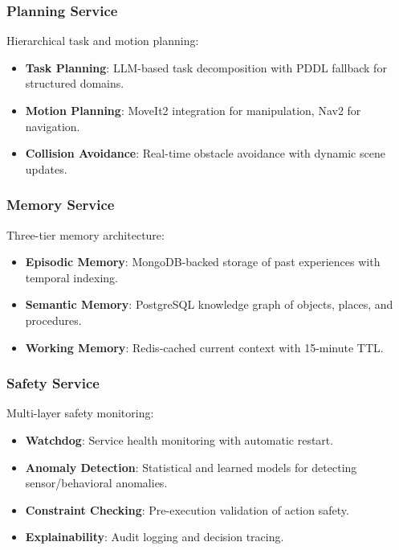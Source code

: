 \documentclass[conference]{IEEEtran}
\begin{document}
\subsubsection{Planning Service}

Hierarchical task and motion planning:

\begin{itemize}
    \item \textbf{Task Planning}: LLM-based task decomposition with PDDL fallback for structured domains.
    
    \item \textbf{Motion Planning}: MoveIt2 integration for manipulation, Nav2 for navigation.
    
    \item \textbf{Collision Avoidance}: Real-time obstacle avoidance with dynamic scene updates.
\end{itemize}

\subsubsection{Memory Service}

Three-tier memory architecture:

\begin{itemize}
    \item \textbf{Episodic Memory}: MongoDB-backed storage of past experiences with temporal indexing.
    
    \item \textbf{Semantic Memory}: PostgreSQL knowledge graph of objects, places, and procedures.
    
    \item \textbf{Working Memory}: Redis-cached current context with 15-minute TTL.
\end{itemize}

\subsubsection{Safety Service}

Multi-layer safety monitoring:

\begin{itemize}
    \item \textbf{Watchdog}: Service health monitoring with automatic restart.
    
    \item \textbf{Anomaly Detection}: Statistical and learned models for detecting sensor/behavioral anomalies.
    
    \item \textbf{Constraint Checking}: Pre-execution validation of action safety.
    
    \item \textbf{Explainability}: Audit logging and decision tracing.
\end{itemize}
\end{document}

